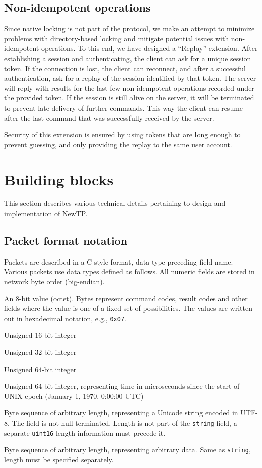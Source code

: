 %

\subsection{Non-idempotent operations}

Since native locking is not part of the protocol, we make an attempt to minimize problems with directory-based
locking and mitigate potential issues with non-idempotent operations. To this end, we have designed
a ``Replay'' extension. After establishing a session and authenticating, the client can ask for a unique
session token. If the connection is lost, the client can reconnect, and after a successful authentication, ask
for a replay of the session identified by that token. The server will reply with results for the last few
non-idempotent operations recorded under the provided token. If the session is still alive on the server, it
will be terminated to prevent late delivery of further commands. This way the client can resume after the last
command that was successfully received by the server.

Security of this extension is ensured by using tokens that are long enough to prevent guessing, and only
providing the replay to the same user account.


\section{Building blocks}

This section describes various technical details pertaining to design and implementation of NewTP.

%

\subsection{Packet format notation}

Packets are described in a C-style format, data type preceding field name. Various packets use data types
defined as follows. All numeric fields are stored in network byte order (big-endian).

\def\ttitem#1{ \item[\ttfamily #1] }
\begin{description}[leftmargin=1.7cm,style=sameline]
	\ttitem{byte} An 8-bit value (octet). Bytes represent command codes, result codes and other fields
		where the value is one of a fixed set of possibilities. The values are written out in
		hexadecimal notation, e.g., {\tt 0x07}.
	\ttitem{uint16} Unsigned 16-bit integer
	\ttitem{uint32} Unsigned 32-bit integer
	\ttitem{uint64} Unsigned 64-bit integer
	\ttitem{time\_t} Unsigned 64-bit integer, representing time in microseconds since the start of UNIX
		epoch (January 1, 1970, 0:00:00 UTC)
	\ttitem{string} Byte sequence of arbitrary length, representing a Unicode string encoded in UTF-8.
		The field is not null-terminated. Length is not part of the {\tt string} field, a separate
		{\tt uint16} length information must precede it.
	\ttitem{data} Byte sequence of arbitrary length, representing arbitrary data. Same as {\tt string},
		length must be specified separately.
\end{description}

